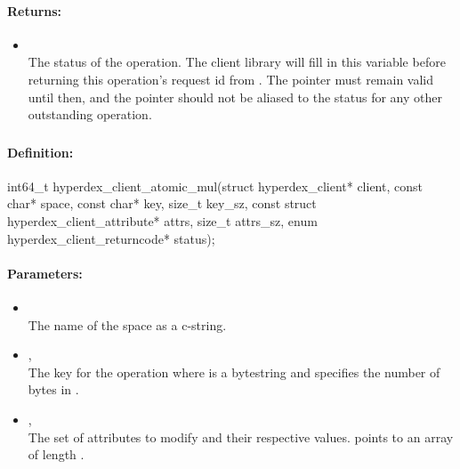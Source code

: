 \paragraph{Returns:}
\begin{itemize}[noitemsep]
\item {}\\
The status of the operation.  The client library will fill in this variable before returning this operation's request id from .  The pointer must remain valid until then, and the pointer should not be aliased to the status for any other outstanding operation.
\end{itemize}

\pagebreak
\subsubsection{}
\label{api:c:atomic_mul}


\paragraph{Definition:}
\begin{ccode}
int64_t hyperdex_client_atomic_mul(struct hyperdex_client* client,
        const char* space,
        const char* key, size_t key_sz,
        const struct hyperdex_client_attribute* attrs, size_t attrs_sz,
        enum hyperdex_client_returncode* status);
\end{ccode}

\paragraph{Parameters:}
\begin{itemize}[noitemsep]
\item {}\\
The name of the space as a c-string.
\item {}, \\
The key for the operation where  is a bytestring and  specifies the number of bytes in .
\item {}, \\
The set of attributes to modify and their respective values.   points to an array of length .
\end{itemize}

